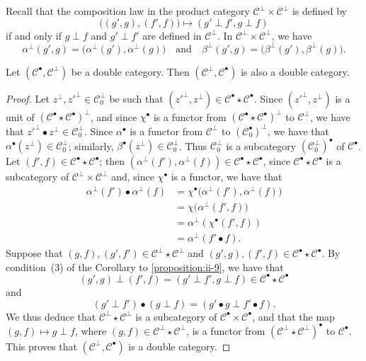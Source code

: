 \documentclass[a4paper,fleqn]{article}
\theoremstyle{plain}
\newenvironment{theorem}[1]
  {\renewcommand\theinnertheorem{#1}\innertheorem}
  {\endinnertheorem}
\theoremstyle{definition}
\newcommand{\oldpage}[1]{{\marginpar{\footnotesize$\bigg\vert$\,\,\,\,\textit{p.~#1}}}}
\newcommand{\textand}{\quad\text{and}\quad}
\newcommand{\CC}{\mathcal{C}}
\newcommand{\smallbullet}{\bullet}
\begin{document}
Recall that the composition law in the product category $\CC^\perp\times\CC^\perp$ is defined by
\[
  \big(
    (g',g), (f',f)
  \big)
  \longmapsto (g'\perp f',g\perp f)
\]
if and only if $g\perp f$ and $g'\perp f'$ are defined in $\CC^\perp$.
In $\CC^\perp\times\CC^\perp$, we have
\[
  \alpha^\perp(g',g)
  =\big(
    \alpha^\perp(g'), \alpha^\perp(g)
  \big)
  \textand
  \beta^\perp(g',g)
  =\big(
    \beta^\perp(g'), \beta^\perp(g)
  \big).
\]

\oldpage{390}

\begin{theorem}{4}
\label{theorem:ii-4}
  Let $(\CC^\smallbullet,\CC^\perp)$ be a double category.
  Then $(\CC^\perp,\CC^\smallbullet)$ is also a double category.
\end{theorem}

\begin{proof}
  Let $z^\perp,z'^\perp\in\CC_0^\perp$ be such that $(z'^\perp,z^\perp)\in\CC^\smallbullet\star\CC^\smallbullet$.
  Since $(z'^\perp,z^\perp)$ is a unit of $(\CC^\smallbullet\star\CC^\smallbullet)^\perp$, and since $\chi^\smallbullet$ is a functor from $(\CC^\smallbullet\star\CC^\smallbullet)^\perp$ to $\CC^\perp$, we have that $z'^{\perp}\smallbullet z^\perp\in\CC_0^\perp$.
  Since $\alpha^\smallbullet$ is a functor from $\CC^\perp$ to $(\CC_0^\smallbullet)^\perp$, we have that $\alpha^\smallbullet(z^\perp)\in\CC_0^\perp$;
  similarly, $\beta^\smallbullet(z^\perp)\in\CC_0^\perp$.
  Thus $\CC_0^\perp$ is a subcategory $(\CC_0^\perp)^\smallbullet$ of $\CC^\smallbullet$.
  Let $(f',f)\in\CC^\smallbullet\star\CC^\smallbullet$;
  then $(\alpha^\perp(f'),\alpha^\perp(f))\in\CC^\smallbullet\star\CC^\smallbullet$, since $\CC^\smallbullet\star\CC^\smallbullet$ is a subcategory of $\CC^\perp\times\CC^\perp$ and, since $\chi^\smallbullet$ is a functor, we have that
  \[
    \begin{aligned}
      \alpha^\perp(f')\smallbullet\alpha^\perp(f)
      &= \chi^\smallbullet\big(
        \alpha^\perp(f'), \alpha^\perp(f)
      \big)
    \\&= \chi\big(
        \alpha^\perp(f',f)
      \big)
    \\&= \alpha^\perp(\chi^\smallbullet(f',f))
    \\&= \alpha^\perp(f'\smallbullet f).
    \end{aligned}
  \]
  Suppose that $(g,f),(g',f')\in\CC^\perp\star\CC^\perp$ and $(g',g),(f',f)\in\CC^\smallbullet\star\CC^\smallbullet$.
  By condition~(3) of the Corollary to \cref{proposition:ii-9}, we have that
  \[
    (g',g)\perp(f',f)
    = (g'\perp f',g\perp f)
    \in\CC^\smallbullet\star\CC^\smallbullet
  \]
  and
  \[
    (g'\perp f')\smallbullet(g\perp f)
    = (g'\smallbullet g\perp f'\smallbullet f).
  \]
  We thus deduce that $\CC^\perp\star\CC^\perp$ is a subcategory of $\CC^\smallbullet\times\CC^\smallbullet$, and that the map $(g,f)\mapsto g\perp f$, where $(g,f)\in\CC^\perp\star\CC^\perp$, is a functor from $(\CC^\perp\star\CC^\perp)^\smallbullet$ to $\CC^\smallbullet$.
  This proves that $(\CC^\perp,\CC^\smallbullet)$ is a double category.
\end{proof}
\end{document}
